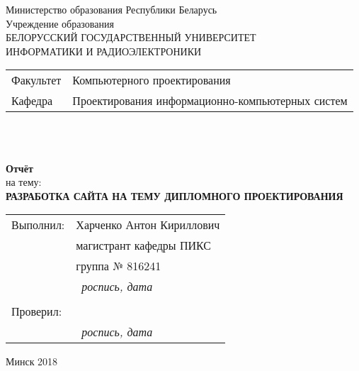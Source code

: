 \begin{titlepage}
  \begin{center}
    Министерство образования Республики Беларусь\\[1em]
    Учреждение образования\\
    БЕЛОРУССКИЙ ГОСУДАРСТВЕННЫЙ УНИВЕРСИТЕТ \\
    ИНФОРМАТИКИ И РАДИОЭЛЕКТРОНИКИ\\[1em]

    \begin{minipage}{\textwidth}
      \begin{flushleft}
        \begin{tabular}{ l l }
          Факультет & Компьютерного проектирования\\
          Кафедра   & Проектирования информационно-компьютерных систем
        \end{tabular}
      \end{flushleft}
    \end{minipage}\\[3em]

	\begin{minipage}{0.4\textwidth}
		
	\end{minipage}\\[2.2em]

    \textbf{Отчёт}\\
    {на тему:}\\[1em]
    \textbf{\large\MakeUppercase{Разработка сайта на тему дипломного проектирования}}\\[1em]

    
    \begin{flushright}
      \begin{tabular}{ l l }
        Выполнил: & Харченко Антон Кириллович\\
        & магистрант кафедры ПИКС\\
        & группа № 816241\\
        & \hrulefill \ \textit{роспись, дата}\\
        & \\
        Проверил: & \hrulefill \\
        & \hrulefill \ \textit{роспись, дата}\\
      \end{tabular}
    \end{flushright}
    
    \vfill
    {\normalsize Минск 2018}
  \end{center}
\end{titlepage}